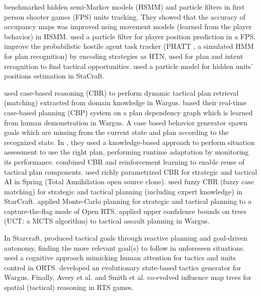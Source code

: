 \cite{Hladky_anevaluation} benchmarked hidden semi-Markov models (HSMM) and particle filters in first person shooter games (FPS) units tracking. They showed that the accuracy of occupancy maps was improved using movement models (learned from the player behavior) in HSMM. \cite{particlefiltergameAI} used a particle filter for player position prediction in a FPS. \cite{Kabanza2010} improve the probabilistic hostile agent task tracker (PHATT \citep{PHATT}, a simulated HMM for plan recognition) by encoding strategies as HTN, used for plan and intent recognition to find tactical opportunities. \cite{weber2011aiide} used a particle model for hidden units' positions estimation in StaCraft.

\cite{LTW} used case-based reasoning (CBR) to perform dynamic tactical plan retrieval (matching) extracted from domain knowledge in Wargus. \cite{Ontanon2007} based their real-time case-based planning (CBP) system on a plan dependency graph which is learned from human demonstration in Wargus. A case based behavior generator spawn goals which are missing from the current state and plan according to the recognized state. In \citep{Mishra2008,metalevelbehavioradaptrts}, they used a knowledge-based approach to perform situation assessment to use the right plan, performing runtime adaptation by monitoring its performance. \cite{CBR-RL} combined CBR and reinforcement learning to enable reuse of tactical plan components. 
\cite{Bakkes09} used richly parametrized CBR for strategic and tactical AI in Spring (Total Annihilation open source clone). 
\cite{CadenaG11} used fuzzy CBR (fuzzy case matching) for strategic and tactical planning (including expert knowledge) in StarCraft. \cite{Chung05} applied Monte-Carlo planning for strategic and tactical planning to a capture-the-flag mode of Open RTS. \cite{UCT} applied upper confidence bounds on trees (UCT: a MCTS algorithm) to tactical assault planning in Wargus. 

In Starcraft, \cite{Weber2010cr,WeberCIG10} produced tactical goals through reactive planning and goal-driven autonomy, finding the more relevant goal(s) to follow in unforeseen situations. 
\cite{SORTS} used a cognitive approach mimicking human attention for tactics and units control in ORTS. \cite{PonsenMSA06} developed an evolutionary state-based tactics generator for Wargus. %
Finally, Avery et al. \cite{Avery09} and Smith et al. \cite{SmithCIG10} co-evolved influence map trees for spatial (tactical) reasoning in RTS games. 

